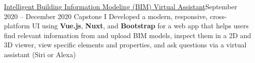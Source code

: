 
\subheading
    {\href{https://github.com/hllywluis/bim-assistant}{Intelligent Building Information Modeling (BIM) Virtual Assistant}}{September 2020 -- December 2020}
    {Capstone I}{}
    \itemListStart
    \listItem{}
        {Developed a modern, responsive, cross-platform UI using \textbf{Vue.js}, \textbf{Nuxt}, and \textbf{Bootstrap} for a web app that helps users find relevant information from and upload BIM models, inspect them in a 2D and 3D viewer, view specific elements and properties, and ask questions via a virtual assistant (Siri or Alexa)}
    \itemListEnd